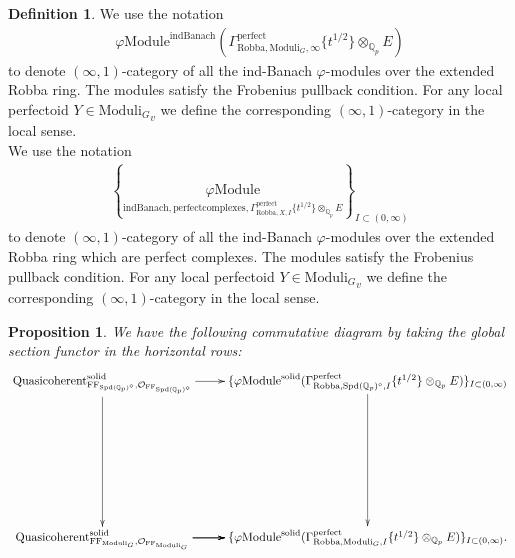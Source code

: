 \documentclass[12pt]{book}
\newtheorem{proposition}{Proposition}
\theoremstyle{definition}
\newtheorem{definition}{Definition}
\begin{document}
\begin{definition}
We use the notation
\begin{align}
\varphi\mathrm{Module}^{\mathrm{indBanach}}(\Gamma^\text{perfect}_{\text{Robba},{\mathrm{Moduli}_G},\infty}\{t^{1/2}\}\otimes_{\mathbb{Q}_p}E)
\end{align}
to denote $(\infty,1)$-category of all the ind-Banach $\varphi$-modules over the extended Robba ring. The modules satisfy the Frobenius pullback condition. For any local perfectoid $Y\in {\mathrm{Moduli}_G}_v$ we define the corresponding $(\infty,1)$-category in the local sense.\\
We use the notation
\begin{align}
\left\{\underset{\mathrm{indBanach,perfectcomplexes},\Gamma^\text{perfect}_{\text{Robba},X,I}\{t^{1/2}\}\otimes_{\mathbb{Q}_p}E}{\varphi\mathrm{Module}}\right\}_{I\subset (0,\infty)}
\end{align}
to denote $(\infty,1)$-category of all the ind-Banach $\varphi$-modules over the extended Robba ring which are perfect complexes. The modules satisfy the Frobenius pullback condition. For any local perfectoid $Y\in {\mathrm{Moduli}_G}_v$ we define the corresponding $(\infty,1)$-category in the local sense. 

\end{definition}


\begin{proposition}
We have the following commutative diagram by taking the global section functor in the horizontal rows:\\
\[\displayindent=+0in
\xymatrix@R+7pc{
\mathrm{Quasicoherent}^{\mathrm{solid}}_{\mathrm{FF}_{\mathrm{Spd}(\mathbb{Q}_p)^\diamond},\mathcal{O}_{\mathrm{FF}_{\mathrm{Spd}(\mathbb{Q}_p)^\diamond}}} \ar[r] \ar[d] &\{\varphi\mathrm{Module}^{\mathrm{solid}}(\Gamma^\text{perfect}_{\text{Robba},{\mathrm{Spd}(\mathbb{Q}_p)^\diamond},I}\{t^{1/2}\}\otimes_{\mathbb{Q}_p}E)\}_{I\subset (0,\infty)} \ar[d]\\
\mathrm{Quasicoherent}^{\mathrm{solid}}_{\mathrm{FF}_{\mathrm{Moduli}_G},\mathcal{O}_{\mathrm{FF}_{\mathrm{Moduli}_G}}}  \ar[r] \ar[r] \ar[r] &\{\varphi\mathrm{Module}^{\mathrm{solid}}(\Gamma^\text{perfect}_{\text{Robba},{\mathrm{Moduli}_G},I}\{t^{1/2}\}\otimes_{\mathbb{Q}_p}E)\}_{I\subset (0,\infty)}.  \\  
}
\]
\end{proposition}
\end{document}
